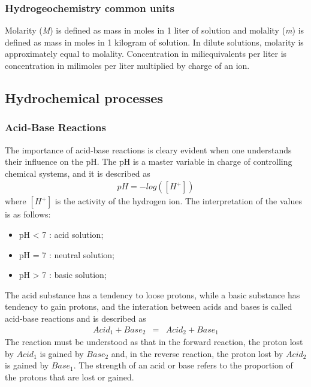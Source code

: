 \subsubsection{Hydrogeochemistry common units}
Molarity (\emph{M}) is defined as mass in moles in 1 liter of solution and molality (\emph{m}) is defined as mass in moles in 1 kilogram of solution. In dilute solutions, molarity is approximately equal to molality. Concentration in miliequivalents per liter is concentration in milimoles per liter multiplied by charge of an ion.

\subsection{Hydrochemical processes}

\subsubsection{Acid-Base Reactions}
The importance of acid-base reactions is cleary evident when one understands their influence on the pH. The pH is a master variable in charge of controlling chemical systems, and it is described as
\begin{eqnarray}
pH = - log([H^+])
\end{eqnarray}
where $[H^+]$ is the activity of the hydrogen ion. The interpretation of the values is as follows:
\begin{itemize}
\item pH < 7 : acid solution;
\item pH = 7 : neutral solution;
\item pH > 7 : basic solution;
\end{itemize}
The acid substance has a tendency to loose protons, while a basic substance has tendency to gain protons, and the interation between acids and bases is called acid-base reactions and is described as
\begin{eqnarray}
Acid_1 + Base_2 &=& Acid_2 + Base_1
\end{eqnarray}
The reaction must be understood as that in the forward reaction, the proton lost by $Acid_1$ is gained by $Base_2$ and, in the reverse reaction, the proton lost by $Acid_2$ is gained by $Base_1$.  The strength of an acid or base refers to the proportion of the protons that are lost or gained. 

